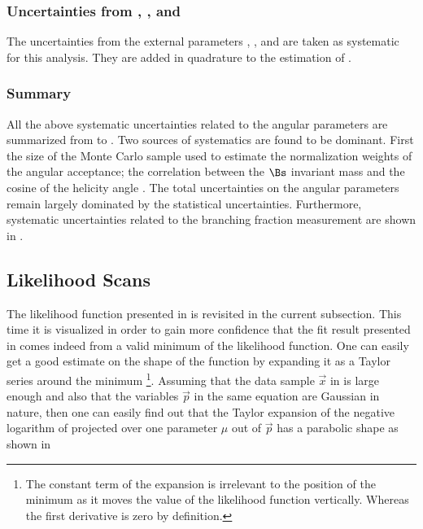 \subsubsection{Uncertainties from \fdfs, \BRof\BdJpsiKst, and \BRof\BsJpsiPhi}
The uncertainties from the external parameters \fdfs, \BRof\BdJpsiKst, and \BRof\BsJpsiPhi are
taken as systematic for this analysis. They are added in quadrature to the estimation of
\BRof\BsJpsiKst.

\subsubsection{Summary}
\label{systSummary}
All the above systematic uncertainties related to the angular parameters are summarized from 
to . Two sources of systematics are found to be dominant. First the size of the Monte
Carlo sample used to estimate the normalization weights of the angular acceptance; the correlation between the $\Bs$ invariant
mass and the cosine of the helicity angle \thetamu. The total uncertainties on the angular parameters remain largely dominated
by the statistical uncertainties. Furthermore, systematic uncertainties related to the branching fraction measurement
are shown in .

\subsection{Likelihood Scans}
\label{nllscans}

The likelihood function presented in  is revisited in the current subsection.
This time it is visualized in order to gain more confidence that the fit result presented in 
comes indeed from a valid minimum of the likelihood function. One can easily get a good estimate on the shape of the function
by expanding it as a Taylor series around the
minimum \footnote{The constant term of the
expansion is irrelevant to the position of the minimum as it moves the value of the likelihood function vertically. Whereas
the first derivative is zero by definition.}. Assuming that the data sample $\vec{x}$ in  is large enough
and also that the variables $\vec{p}$ in the same equation are Gaussian in nature, then one can easily find out that the
Taylor expansion of the negative logarithm of  projected over one parameter $\mu$ out of $\vec{p}$ has a
parabolic shape as shown in 

